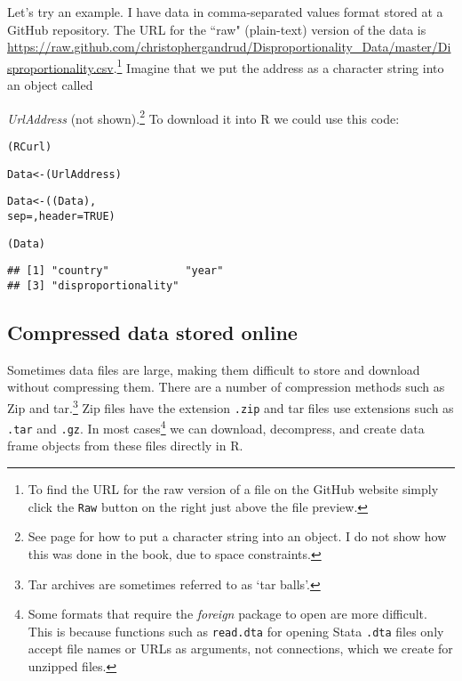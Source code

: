 Let's try an example. I have data in comma-separated values format stored at a GitHub repository. The URL for the ``raw" (plain-text) version of the data is \url{https://raw.github.com/christophergandrud/Disproportionality_Data/master/Disproportionality.csv}.\footnote{To find the URL for the raw version of a file on the GitHub website simply click the \texttt{Raw} button on the right just above the file preview.} Imagine that we put the address as a character string into an object called {\emph{UrlAddress} (not shown).\footnote{See page \pageref{Objects} for how to put a character string into an object. I do not show how this was done in the book, due to space constraints.}
To download it into R we could use this code:




\begin{knitrout}
\color{fgcolor}\begin{kframe}
\begin{alltt}
(RCurl)

Data <- (UrlAddress)

Data <- ((Data), 
                    sep = , header = TRUE)
                    
(Data)
\end{alltt}
\begin{verbatim}
## [1] "country"            "year"              
## [3] "disproportionality"
\end{verbatim}
\end{kframe}
\end{knitrout}


\subsection{Compressed data stored online}

Sometimes data files are large, making them difficult to store and download without compressing them. There are a number of compression methods such as Zip and tar.\footnote{Tar archives are sometimes referred to as `tar balls'.} Zip files have the extension {\tt{.zip}} and tar files use extensions such as {\tt{.tar}} and {\tt{.gz}}. In most cases\footnote{Some formats that require the {\emph{foreign}} package to open are more difficult. This is because functions such as {\tt{read.dta}} for opening Stata {\tt{.dta}} files only accept file names or URLs as arguments, not connections, which we create for unzipped files.} we can download, decompress, and create data frame objects from these files directly in R. 

}
